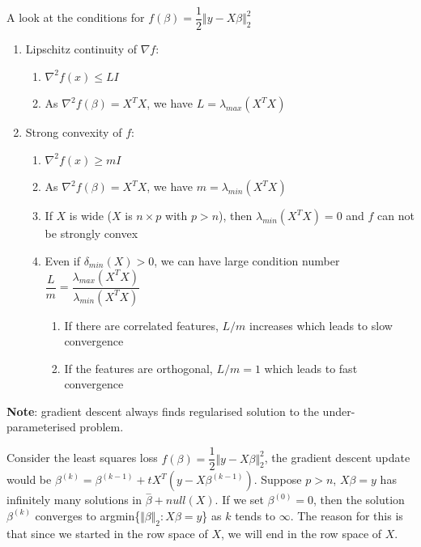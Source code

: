 \documentclass[a4paper]{article}
\begin{document}
{\noindent A look at the conditions for $f(\beta) = \dfrac{1}{2} \Vert y - X \beta \Vert_2^2$
\begin{enumerate}
  \item Lipschitz continuity of $\nabla f$:
  \begin{enumerate}
    \item $\nabla^2 f(x) \leq L I$
    \item As $\nabla^2 f(\beta) = X^T X$, we have $L = \lambda_{max}(X^T X)$
  \end{enumerate}
  \item Strong convexity of $f$:
  \begin{enumerate}
    \item $\nabla^2 f(x) \geq m I$
   \item As $\nabla^2 f(\beta) = X^T X$, we have $m = \lambda_{min}(X^T X)$
   \item If $X$ is wide ($X$ is $n \times p$ with $p > n$), then  $\lambda_{min} (X^T X) = 0$ and $f$ can not be strongly convex
   \item Even if $\delta_{min}(X) > 0$, we can have large condition number $\dfrac{L}{m} = \dfrac{\lambda_{max} (X^T X)}{\lambda_{min} (X^T X)}$
   \begin{enumerate}
    \item If there are correlated features, $L / m$ increases which leads to slow convergence
    \item If the features are orthogonal, $L / m = 1$ which leads to fast convergence 
   \end{enumerate} 
  \end{enumerate}
\end{enumerate}
\noindent \textbf{Note}: gradient descent always finds regularised solution to the under-parameterised problem.

\noindent Consider the least squares loss $f(\beta) = \dfrac{1}{2} \Vert y - X \beta \Vert_2^2$, the gradient descent update would be $\beta^{(k)} = \beta^{(k-1)} + t X^T (y - X \beta^{(k-1)})$. Suppose $p > n$, $X \beta = y$ has infinitely many solutions in $\overset{-}{\beta} + null(X)$. If we set $\beta^{(0)} = 0$, then the solution $\beta^{(k)}$ converges to argmin\{$\Vert \beta \Vert_2 : X\beta =y$\} as $k$ tends to $\infty$. The reason for this is that since we started in the row space of $X$, we will end in the row space of $X$.

}
\end{document}
